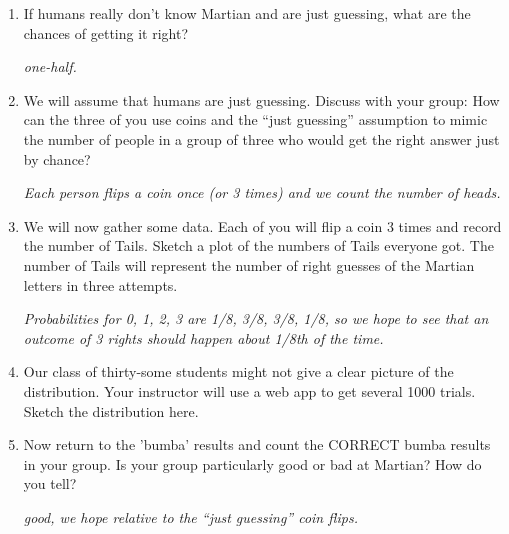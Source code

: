 \begin{enumerate}
\item  If humans really don't know Martian and are just guessing, what
  are the chances of getting it right? 
\begin{students}
  \vspace{1cm}
\end{students}    
\begin{key}
   {\it one-half.}
\end{key}
 
  \item We will assume that humans are just guessing. Discuss with
    your group: How can the three of you use  coins and the ``just
    guessing'' assumption to mimic  the number of people in a group
    of three who would get the right answer just by chance?
\begin{students}
  \vspace{1.5cm}
\end{students}    
\begin{key}
   {\it Each person flips a coin once (or 3 times) and we count the
     number of heads.}
\end{key}
 
\item  \label{flip3} We will now gather some data.  Each of you will
  flip a coin 3 times and record the number of Tails.  Sketch a plot
  of the numbers of Tails everyone got. The number of Tails will
  represent the number of right guesses of the Martian letters in
  three attempts.   
\begin{students}
  \vspace{3cm}
\end{students}    
\begin{key}
   {\it Probabilities for 0, 1, 2, 3 are 1/8, 3/8, 3/8, 1/8, so we
     hope to see that an outcome of 3 rights should happen about 1/8th
   of the time.}
\end{key}

\item Our class of thirty-some students might not give a clear picture
  of the distribution.  Your instructor will use a web app to get
  several 1000 trials.  Sketch the distribution here. 
\begin{students}
  \vspace{3cm}
\end{students}   

\item Now return to the 'bumba' results and count the CORRECT bumba
  results in your group.  Is your group particularly good or bad at
  Martian? How do you tell?
\begin{students}
  \vspace{1cm}
\end{students}    
\begin{key}
   {\it good, we hope relative to the ``just guessing'' coin flips.}
\end{key}



\end{enumerate}
